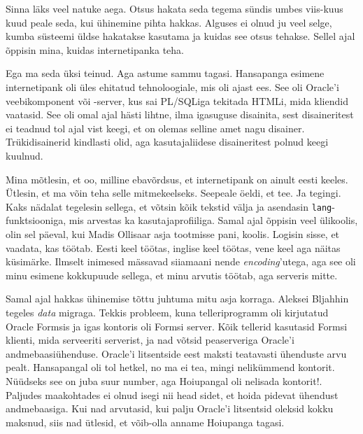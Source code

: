 Sinna läks veel natuke aega. Otsus hakata seda tegema sündis 
umbes viis-kuus kuud peale seda, kui ühinemine pihta hakkas. Alguses  
ei olnud ju veel selge, kumba süsteemi üldse hakatakse kasutama ja kuidas see 
otsus tehakse. Sellel ajal õppisin mina, kuidas internetipanka teha.


Ega ma seda üksi teinud. Aga astume sammu tagasi. Hansapanga esimene 
internetipank oli üles ehitatud tehnoloogiale, mis oli ajast ees. See 
oli Oracle'i veebikomponent või -server, kus 
sai PL/SQLiga tekitada HTMLi, mida kliendid 
vaatasid. See oli omal ajal hästi lihtne, ilma igasuguse disainita, sest 
disaineritest ei teadnud tol ajal vist keegi, et on olemas selline amet nagu disainer. 
Trükidisainerid kindlasti olid, aga kasutajaliidese disaineritest polnud keegi kuulnud. 

Mina mõtlesin, et oo, milline 
ebavõrdsus, et internetipank on ainult eesti keeles. Ütlesin, et ma võin teha selle 
mitmekeelseks. Seepeale öeldi, et tee. Ja tegingi. Kaks nädalat tegelesin 
sellega, et võtsin kõik tekstid välja ja asendasin \verb|lang|-funktsiooniga, mis 
arvestas ka kasutajaprofiiliga. Samal ajal õppisin veel ülikoolis, olin sel
päeval, kui Madis Ollisaar asja tootmisse pani, koolis. 
Logisin sisse, et vaadata, kas töötab. Eesti keel töötas, inglise keel 
töötas, vene keel aga näitas küsimärke. Ilmselt inimesed mässavad siiamaani nende 
\emph{encoding}'utega, aga see oli minu esimene kokkupuude sellega, et minu 
arvutis töötab, aga serveris mitte.

Samal ajal hakkas ühinemise tõttu juhtuma mitu asja korraga.  
Aleksei Bljahhin tegeles \emph{data} migraga. 
Tekkis probleem, kuna telleri{\-}programm oli kirjutatud Oracle Formsis ja igas 
kontoris oli Formsi server. Kõik tellerid kasutasid Formsi klienti, mida 
serveeriti serverist, ja nad võtsid peaserveriga Oracle'i 
andmebaasiühenduse. Oracle'i litsentside eest maksti teatavasti ühenduste arvu 
pealt. Hansapangal oli tol hetkel, no ma ei tea, mingi nelikümmend 
kontorit. Nüüdseks see on juba suur number, aga Hoiupangal oli nelisada 
kontorit!. Paljudes maakohtades ei olnud isegi nii head sidet, et 
hoida pidevat ühendust andmebaasiga. Kui nad arvutasid, kui palju 
Oracle'i litsentsid oleksid kokku maksnud, siis nad ütlesid, et võib-olla anname 
Hoiupanga tagasi. 

